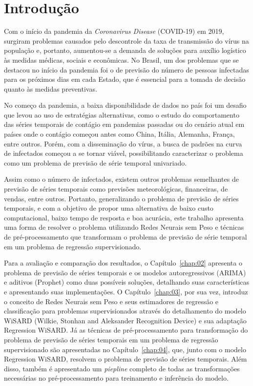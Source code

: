 \chapter{Introdução}

Com o início da pandemia da \textit{Coronavirus Disease} (COVID-19) em 2019, surgiram problemas causados pelo descontrole da taxa de transmissão do vírus na população e, portanto, aumentou-se a demanda de soluções para auxílio logístico às medidas médicas, sociais e econômicas. No Brasil, um dos problemas que se destacou no início da pandemia foi o de previsão do número de pessoas infectadas para os próximos dias em cada Estado, que é essencial para a tomada de decisão quanto às medidas preventivas.

No começo da pandemia, a baixa disponibilidade de dados no país foi um desafio que levou ao uso de estratégias alternativas, como o estudo do comportamento das séries temporais de contágio em pandemias passadas ou do cenário atual em países onde o contágio começou antes como China, Itália, Alemanha, França, entre outros. Porém, com a disseminação do vírus, a busca de padrões na curva de infectados começou a se tornar viável, possibilitando caracterizar o problema como um problema de previsão de série temporal univariado.

Assim como o número de infectados, existem outros problemas semelhantes de previsão de séries temporais como previsões meteorológicas, financeiras, de vendas, entre outros. Portanto, generalizando o problema de previsão de séries temporais, e com a objetivo de propor uma alternativa de baixo custo computacional, baixo tempo de resposta e boa acurácia, este trabalho apresenta uma forma de resolver o problema utilizando Redes Neurais sem Peso e técnicas de pré-processamento que transformam o problema de previsão de série temporal em um problema de regressão supervisionado.

Para a avaliação e comparação dos resultados, o Capítulo~\ref{chap:02} apresenta o problema de previsão de séries temporais e os modelos autoregressivos (ARIMA) e aditivos (Prophet) como duas possíveis soluções, detalhando suas características e apresentando suas implementações. O Capítulo~\ref{chap:03}, por sua vez, introduz o conceito de Redes Neurais sem Peso e seus estimadores de regressão e classificação para problemas supervisionados através do detalhamento do modelo WiSARD (Wilkie, Stonhan and Aleksander Recognition Device) e sua adaptação Regression WiSARD. Já as técnicas de pré-processamento para transformação do problema de previsão de séries temporais em um problema de regressão supervisionado são apresentadas no Capítulo~\ref{chap:04}, que, junto com o modelo Regression WiSARD, resolvem o problema de previsão de séries temporais. Além disso, também é apresentado um \textit{piepline} completo de todas as transformações necessárias no pré-processamento para treinamento e inferência do modelo.